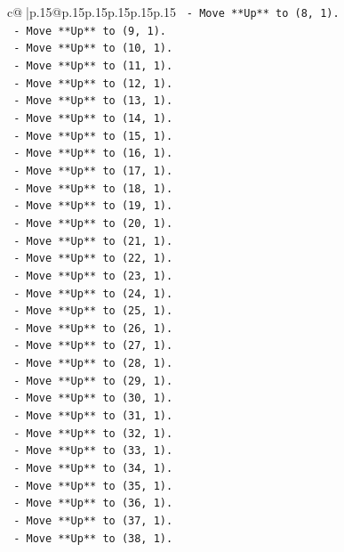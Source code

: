 \documentclass{article}
\begin{document}
{\begin{supertabular}{c@{$\;$}|p{.15\linewidth}@{}p{.15\linewidth}p{.15\linewidth}p{.15\linewidth}p{.15\linewidth}p{.15\linewidth}}
{{{\texttt{    {-} Move **Up** to (8, 1).} \\
\texttt{    {-} Move **Up** to (9, 1).} \\
\texttt{    {-} Move **Up** to (10, 1).} \\
\texttt{    {-} Move **Up** to (11, 1).} \\
\texttt{    {-} Move **Up** to (12, 1).} \\
\texttt{    {-} Move **Up** to (13, 1).} \\
\texttt{    {-} Move **Up** to (14, 1).} \\
\texttt{    {-} Move **Up** to (15, 1).} \\
\texttt{    {-} Move **Up** to (16, 1).} \\
\texttt{    {-} Move **Up** to (17, 1).} \\
\texttt{    {-} Move **Up** to (18, 1).} \\
\texttt{    {-} Move **Up** to (19, 1).} \\
\texttt{    {-} Move **Up** to (20, 1).} \\
\texttt{    {-} Move **Up** to (21, 1).} \\
\texttt{    {-} Move **Up** to (22, 1).} \\
\texttt{    {-} Move **Up** to (23, 1).} \\
\texttt{    {-} Move **Up** to (24, 1).} \\
\texttt{    {-} Move **Up** to (25, 1).} \\
\texttt{    {-} Move **Up** to (26, 1).} \\
\texttt{    {-} Move **Up** to (27, 1).} \\
\texttt{    {-} Move **Up** to (28, 1).} \\
\texttt{    {-} Move **Up** to (29, 1).} \\
\texttt{    {-} Move **Up** to (30, 1).} \\
\texttt{    {-} Move **Up** to (31, 1).} \\
\texttt{    {-} Move **Up** to (32, 1).} \\
\texttt{    {-} Move **Up** to (33, 1).} \\
\texttt{    {-} Move **Up** to (34, 1).} \\
\texttt{    {-} Move **Up** to (35, 1).} \\
\texttt{    {-} Move **Up** to (36, 1).} \\
\texttt{    {-} Move **Up** to (37, 1).} \\
\texttt{    {-} Move **Up** to (38, 1).} \\
}}}
\end{supertabular}}
\end{document}
